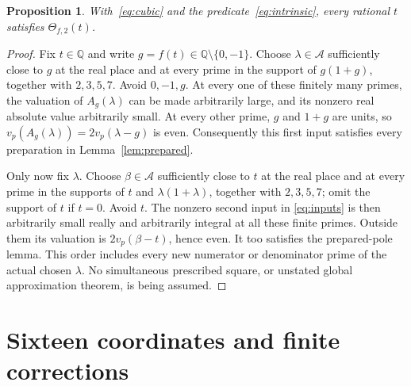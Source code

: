 \documentclass[11pt,a4paper]{article}
\newtheorem{proposition}[theorem]{Proposition}
\newcommand{\Q}{\mathbb Q}\newcommand{\Z}{\mathbb Z}
\begin{document}
\begin{proposition}\label{prop:rational-completeness}
With~\eqref{eq:cubic} and the predicate~\eqref{eq:intrinsic}, every
rational $t$ satisfies $\Theta_{f,2}(t)$.
\end{proposition}
\begin{proof}
Fix $t\in\Q$ and write $g=f(t)\in\Q\setminus\{0,-1\}$.
Choose $\lambda\in\mathcal A$ sufficiently close to $g$ at the real
place and at every prime in the support of $g(1+g)$, together with
$2,3,5,7$. Avoid $0,-1,g$. At every one of these finitely many primes,
the valuation of $A_g(\lambda)$ can be made arbitrarily large, and
its nonzero real absolute value arbitrarily small.
At every other prime, $g$ and $1+g$ are units, so
$v_p(A_g(\lambda))=2v_p(\lambda-g)$ is even. Consequently this first
input satisfies every preparation in Lemma~\ref{lem:prepared}.

Only now fix $\lambda$. Choose $\beta\in\mathcal A$ sufficiently
close to $t$ at the real place and at every prime in the supports of
$t$ and $\lambda(1+\lambda)$, together with $2,3,5,7$; omit the
support of $t$ if $t=0$. Avoid $t$. The nonzero second input in
\eqref{eq:inputs} is then arbitrarily small really and arbitrarily
integral at all these finite primes. Outside them its valuation is
$2v_p(\beta-t)$, hence even. It too satisfies the prepared-pole lemma.
This order includes every new numerator or denominator prime of the
actual chosen $\lambda$. No simultaneous prescribed square, or
unstated global approximation theorem, is being assumed.
\end{proof}

\section{Sixteen coordinates and finite corrections}
\end{document}
